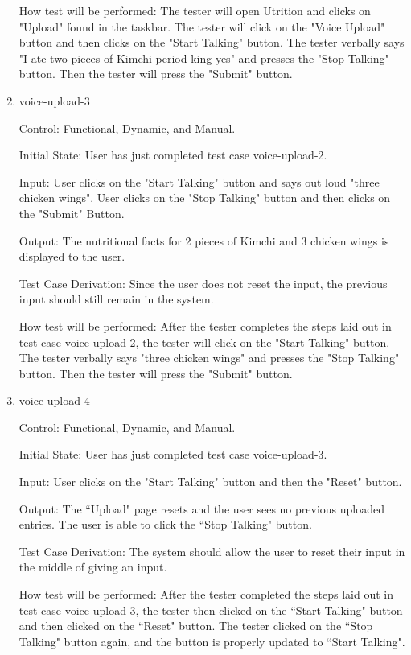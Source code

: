 \documentclass[12pt, titlepage]{article}
\begin{document}
\begin{enumerate}
	How test will be performed: The tester will open Utrition and clicks on "Upload" found in the taskbar. The tester will click on the "Voice Upload" button and then clicks on the "Start Talking" button. The tester verbally says "I ate two pieces of Kimchi period king yes" and presses the "Stop Talking" button. Then the tester will press the "Submit" button.
	
	\item{voice-upload-3\\}
	
	Control: Functional, Dynamic, and Manual.
	
	Initial State: User has just completed test case voice-upload-2.
	
	Input: User clicks on the "Start Talking" button and says out loud "three chicken wings". User clicks on the "Stop Talking" button and then clicks on the "Submit" Button.
	
	Output: The nutritional facts for 2 pieces of Kimchi and 3 chicken wings is displayed to the user.
	
	Test Case Derivation: Since the user does not reset the input, the previous input should still remain in the system.
	
	How test will be performed: After the tester completes the steps laid out in test case voice-upload-2, the tester will click on the "Start Talking" button. The tester verbally says "three chicken wings" and presses the "Stop Talking" button. Then the tester will press the "Submit" button.
	
	\item{voice-upload-4\\}
	
	Control: Functional, Dynamic, and Manual.
	
	Initial State: User has just completed test case voice-upload-3.
	
	Input: User clicks on the "Start Talking" button and then the "Reset" button.
	
	Output: The ``Upload" page resets and the user sees no previous uploaded entries. The user is able to click the ``Stop Talking" button.
	
	Test Case Derivation: The system should allow the user to reset their input in the middle of giving an input.
	
	How test will be performed: After the tester completed the steps laid out in test case voice-upload-3, the tester then clicked on the ``Start Talking" button and then clicked on the ``Reset" button. The tester clicked on the ``Stop Talking" button again, and the button is properly updated to ``Start Talking".
	

\end{enumerate}
\end{document}
